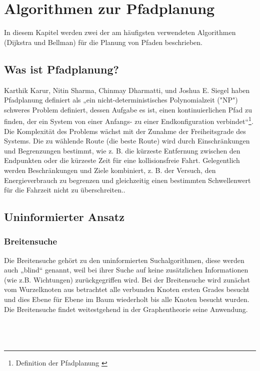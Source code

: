 \chapter{Algorithmen zur Pfadplanung}
In diesem Kapitel werden zwei der am häufigsten verwendeten Algorithmen (Dijkstra und Bellman) für die Planung von Pfaden beschrieben.

\section{Was ist Pfadplanung?}
\label{Was ist Pfadplanung?}
Karthik Karur, Nitin Sharma, Chinmay Dharmatti, und Joshua E. Siegel haben Pfadplanung definiert als „ein nicht-deterministisches Polynomialzeit ("NP") schweres Problem definiert, dessen Aufgabe es ist, einen kontinuierlichen Pfad zu finden, der ein System von einer Anfangs- zu einer Endkonfiguration verbindet“\footnote{Definition der Pfadplanung \cite{Karur2021}}.
\newline
\newline
Die Komplexität des Problems wächst mit der Zunahme der Freiheitsgrade des Systems. Die zu wählende Route (die beste Route) wird durch Einschränkungen und Begrenzungen bestimmt, wie z. B. die kürzeste Entfernung zwischen den Endpunkten oder die kürzeste Zeit für eine kollisionsfreie Fahrt. Gelegentlich werden Beschränkungen und Ziele kombiniert, z. B. der Versuch, den Energieverbrauch zu begrenzen und gleichzeitig einen bestimmten Schwellenwert für die Fahrzeit nicht zu überschreiten.\cite{Karur2021}.

\section{Uninformierter Ansatz}
\label{Uninformierter Ansatz}
\subsection{Breitensuche}
Die Breitensuche gehört zu den uninformierten Suchalgorithmen, diese werden auch „blind“ genannt, weil bei ihrer 
Suche auf keine zusätzlichen Informationen (wie z.B. Wichtungen) zurückgegriffen wird.
Bei der Breitensuche wird zunächst vom Wurzelknoten aus betrachtet alle verbunden Knoten ersten Grades besucht
und dies Ebene für Ebene im Baum wiederholt bis alle Knoten besucht wurden. 
Die Breitensuche findet weitestgehend in der Graphentheorie seine Anwendung.\cite{Russell:10b}
\\
\\
\\
\\
